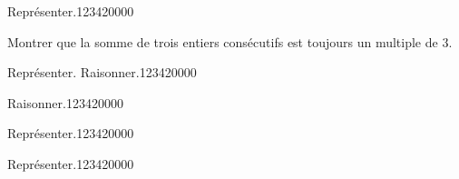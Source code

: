 \begin{pageParcourst}

\begin{ExoCt}{Représenter.}{1234}{2}{0}{0}{0}{0}

 
Montrer que la somme de trois entiers consécutifs est toujours un multiple de 3. 
 

\end{ExoCt}

\begin{ExoCt}{Représenter. Raisonner.}{1234}{2}{0}{0}{0}{0}
 
 


\end{ExoCt}


\begin{ExoCt}{Raisonner.}{1234}{2}{0}{0}{0}{0}
 
\end{ExoCt}

\begin{ExoCt}{Représenter.}{1234}{2}{0}{0}{0}{0}

 

\end{ExoCt}

\begin{ExoCt}{Représenter.}{1234}{2}{0}{0}{0}{0}

 

\end{ExoCt} 
 
\end{pageParcourst}



\begin{pageBrouillon} 
 



\end{pageBrouillon}



